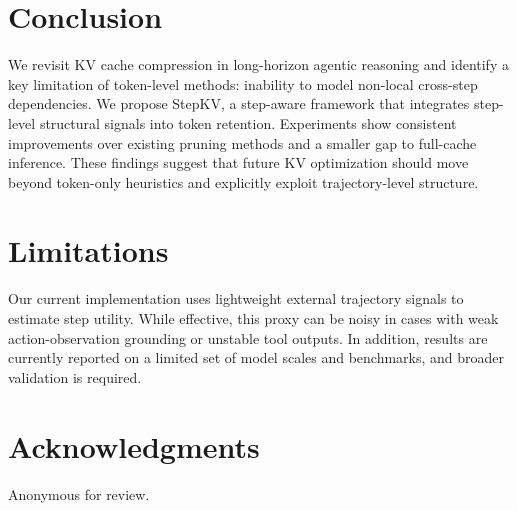 \documentclass[11pt]{article}
\begin{document}
\section{Conclusion}

We revisit KV cache compression in long-horizon agentic reasoning and identify a key limitation of token-level methods: inability to model non-local cross-step dependencies. We propose StepKV, a step-aware framework that integrates step-level structural signals into token retention. Experiments show consistent improvements over existing pruning methods and a smaller gap to full-cache inference. These findings suggest that future KV optimization should move beyond token-only heuristics and explicitly exploit trajectory-level structure.

\section*{Limitations}

Our current implementation uses lightweight external trajectory signals to estimate step utility. While effective, this proxy can be noisy in cases with weak action-observation grounding or unstable tool outputs. In addition, results are currently reported on a limited set of model scales and benchmarks, and broader validation is required.

\section*{Acknowledgments}

Anonymous for review.

\clearpage

\end{document}
